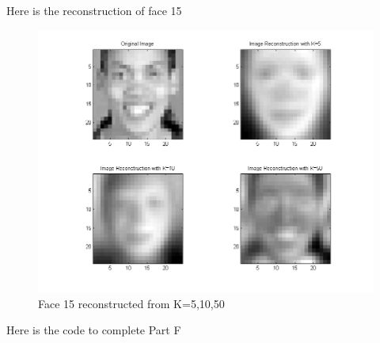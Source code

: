 \documentclass[twoside,11pt]{article}
\theoremstyle{definition}
\begin{document}
\newpage

Here is the reconstruction of face 15 \\
\begin{figure}[h!]
\centering
\includegraphics[width=6 in]{prob3PartF_face15.png}
\caption{Face 15 reconstructed from K=5,10,50}
\end{figure}

\newpage

Here is the code to complete Part F\\

\end{document}
